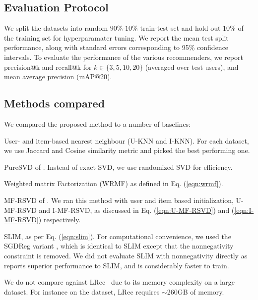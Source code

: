 
\subsection{Evaluation Protocol}
We split the datasets into random $90\%$-$10\%$ train-test set and hold out $10\%$ of the training set for hyperparamater tuning. We report the mean test split performance, along with standard errors corresponding to 95\% confidence intervals.
To evaluate the performance of the various recommenders, we report \textsf{precision@k} and \textsf{recall@k} for $k \in \{ 3, 5, 10, 20 \}$ (averaged over test users), and mean average precision (mAP@20).


\subsection{Methods compared}

We compared the proposed method to a number of baselines:
\begin{compactitem}

	\item User- and item-based nearest neighbour (U-KNN and I-KNN). For each dataset, we use Jaccard and Cosine similarity metric and  picked the best performing one.

	\item PureSVD of \citet{Cremonesi:2010}. Instead of exact SVD, we use randomized SVD for efficiency.
	
	\item Weighted matrix Factorization (WRMF) as defined in Eq. (\ref{eqn:wrmf}).

	\item MF-RSVD of \citet{Tang:2013}.  We ran this method with user and item based initialization, U-MF-RSVD  and I-MF-RSVD, as discussed in Eq. (\ref{eqn:U-MF-RSVD}) and (\ref{eqn:I-MF-RSVD}) respectively.
	\item SLIM, as per Eq. (\ref{eqn:slim}). For computational convenience, we used the SGDReg variant \citep{Levy:2013}, which is identical to SLIM  except that the nonnegativity constraint is removed. We did not evaluate SLIM with nonnegativity directly as~\citet{Levy:2013} reports superior performance to SLIM, and is considerably faster to train.
\end{compactitem}
We do not compare against LRec~\citep{Sedhain:2016} due to its memory complexity on a large dataset. For instance on the \Lowes dataset, LRec requires $\sim$260GB of memory. 
